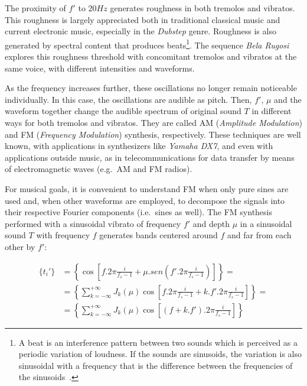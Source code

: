The proximity of $f'$ to $20Hz$ generates roughness in both tremolos and vibratos. This roughness is largely appreciated both in traditional classical music and current electronic music, especially in the \emph{Dubstep} genre. Roughness is also generated by spectral content that produces beats\footnote{A beat is an interference pattern between two sounds which is perceived as a periodic variation of loudness. If the sounds are sinusoids, the variation is also sinusoidal with a frequency that is the difference between the frequencies of the sinusoids~\cite{Porres,porres2009}.}. The sequence \emph{Bela Rugosi} explores this roughness threshold with concomitant tremolos and vibratos at the same voice, with different intensities and waveforms.~\cite{MASSA}

As the frequency increases further, these oscillations no longer remain noticeable individually. In this case, the oscillations are audible as pitch. Then, $f'$, $\mu$ and the waveform together change the audible spectrum of original sound $T$ in different ways for both tremolos and vibratos. They are called AM (\emph{Amplitude Modulation}) and FM (\emph{Frequency Modulation}) synthesis,
respectively. These techniques are well known, with applications in
synthesizers like \emph{Yamaha DX7}, and even with applications outside music, as in telecommunications for data transfer by means of electromagnetic waves (e.g.\ AM and FM radios).

For musical goals, it is convenient to understand FM when only pure
sines are used and, when other waveforms are employed,
to decompose the signals into their respective Fourier components (i.e.\ sines as well).
The FM synthesis performed with a sinusoidal vibrato of frequency $f'$ and depth $\mu$
in a sinusoidal sound $T$ with frequency $f$ generates bands centered around $f$ and far from each other by $f'$:

\begin{equation}\label{eq:fmEsp}
\begin{split}
\{t_i'\} & = \left \{ \cos \left [f . 2 \pi \frac{i}{f_s-1} + \mu . sen \left ( f' . 2 \pi \frac{i}{ f_s -1 } \right ) \right ] \right \} = \\
 & = \left \{ \sum_{k=-\infty}^{+\infty} J_k(\mu) \cos \left [ f . 2 \pi \frac{i}{f_s-1} + k . f' . 2 \pi \frac{i}{f_s-1} \right ]  \right \} = \\
 & = \left \{ \sum_{k=-\infty}^{+\infty} J_k(\mu) \cos \left [ (f+k.f') . 2 \pi \frac{i}{f_s-1} \right ]  \right \}
\end{split}
\end{equation}


